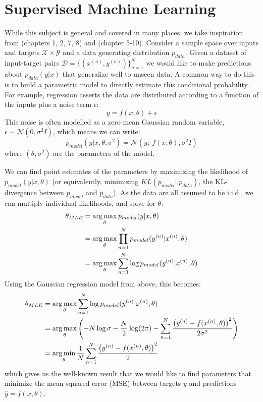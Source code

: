 \section{Supervised Machine Learning}\label{sec:ch2:supervised}
While this subject is general and covered in many places, we take inspiration
from \cite{murphy_machine_2012} (chapters 1, 2, 7, 8) and
\cite{goodfellow_deep_2016} (chapter 5-10).
Consider a sample space over inputs and targets $\mathcal{X} \times \mathcal{Y}$
and a data generating distribution $p_{data}$. Given a dataset of input-target
pairs $\mathcal{D} = \{(x^{(n)}, y^{(n)})\}_{n=1}^N$ we would like to make
predictions about $p_{data}(y|x)$ that generalize well to unseen data. A common
way to do this is to build a parametric model to directly estimate this
conditional probability.  For example, regression asserts the data are
distributed according to a function of the inputs plus a noise term $\epsilon$:
\begin{equation}
  y = f(x, \theta) + \epsilon
\end{equation}
This noise is often modelled as a zero-mean Gaussian random variable, $\epsilon
\sim \mathcal{N}(0, \sigma^2I)$, which means we can write:
\begin{equation}\label{eq:ch2:regression}
  p_{model}(y|x, \theta, \sigma^2) = \mathcal{N}(y;\ f(x, \theta), \sigma^2I)
\end{equation}
where $(\theta, \sigma^2)$ are the parameters of the model.

We can find point estimates of the parameters by maximizing the likelihood of
$p_{model}(y|x, \theta)$ (or equivalently, minimizing $KL(p_{model}||p_{data})$, the KL-divergence between
$p_{model}$ and $p_{data}$). As the data are all assumed to be
i.i.d., we can multiply individual likelihoods, and solve for $\theta$:
\begin{align}
  \theta_{MLE} &= \operatorname*{arg\,max}_{\theta} p_{model}(y|x, \theta) \\
              &= \operatorname*{arg\,max}_{\theta} \prod_{n=1}^{N} p_{model}(y^{(n)}|x^{(n)}, \theta) \\
              &= \operatorname*{arg\,max}_{\theta} \sum_{n=1}^N \log p_{model}(y^{(n)}|x^{(n)}, \theta)
\end{align}
Using the Gaussian regression model from above, this becomes:
\begin{align}
  \theta_{MLE} &= \operatorname*{arg\,max}_{\theta} \sum_{n=1}^N \log p_{model}(y^{(n)}|x^{(n)}, \theta) \\
              &= \operatorname*{arg\,max}_{\theta} \left(-N\log \sigma - \frac{N}{2}\log (2\pi) - \sum_{n=1}^{N}
                  \frac{\left(y^{(n)} - f(x^{(n)}, \theta)\right)^2}{2\sigma^2}\right) \\
                  &= \operatorname*{arg\,min}_{\theta}\frac{1}{N}\sum_{n=1}^{N} \frac{\left(y^{(n)} - f(x^{(n)}, \theta)\right)^2}{2} \label{eq:ch2:mle_reg}
\end{align}
which gives us the well-known result that we would like to find parameters that
minimize the mean squared error (MSE) between targets $y$ and predictions
$\hat{y} = f(x, \theta)$.

